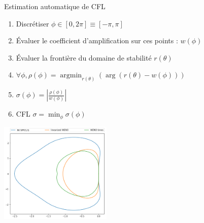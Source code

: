 \documentclass{beamer}
\DeclareMathOperator*{\argmin}{argmin}
\begin{document}
\begin{frame}{Estimation automatique de CFL}
  \begin{enumerate}
    \item Discrétiser $\phi \in [0,2\pi] \equiv [-\pi,\pi]$
    \item Évaluer le coefficient d'amplification sur ces points : $w(\phi)$
    \item Évaluer la frontière du domaine de stabilité $r(\theta)$
    \item $\forall \phi, \rho(\phi) = \argmin_{r(\theta)} (\arg(r(\theta)-w(\phi))) $
    \item $\sigma(\phi) = \left|\frac{\rho(\phi)}{w(\phi)}\right|$
    \item CFL $\sigma = \min_\phi \sigma(\phi)$
  \end{enumerate}
  \begin{center}
    \includegraphics[width=0.4\textwidth]{autocfl.png}
  \end{center}
\end{frame}
\end{document}
